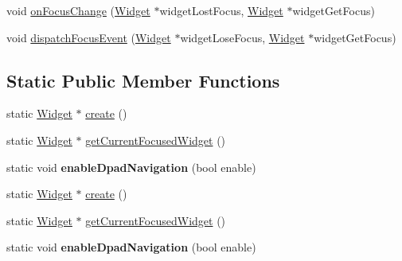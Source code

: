 \begin{DoxyCompactItemize}
void \hyperlink{classui_1_1Widget_a316bfe5fc7d6bd1ebab461af4b79f967}{on\+Focus\+Change} (\hyperlink{classui_1_1Widget}{Widget} $\ast$widget\+Lost\+Focus, \hyperlink{classui_1_1Widget}{Widget} $\ast$widget\+Get\+Focus)
\item 
void \hyperlink{classui_1_1Widget_ae54dd6bc70002d784f9b04fd7ccc057c}{dispatch\+Focus\+Event} (\hyperlink{classui_1_1Widget}{Widget} $\ast$widget\+Lose\+Focus, \hyperlink{classui_1_1Widget}{Widget} $\ast$widget\+Get\+Focus)
\end{DoxyCompactItemize}
\subsection*{Static Public Member Functions}
\begin{DoxyCompactItemize}
\item 
static \hyperlink{classui_1_1Widget}{Widget} $\ast$ \hyperlink{classui_1_1Widget_aa46d0b1357a7bbb7ed3c468e27a5533a}{create} ()
\item 
static \hyperlink{classui_1_1Widget}{Widget} $\ast$ \hyperlink{classui_1_1Widget_ad8525b896c511dee435bdc4251ed6964}{get\+Current\+Focused\+Widget} ()
\item 
\mbox{\label{classui_1_1Widget_abc6584697091ceb9dc81174b1be92979}} 
static void {\bfseries enable\+Dpad\+Navigation} (bool enable)
\item 
static \hyperlink{classui_1_1Widget}{Widget} $\ast$ \hyperlink{classui_1_1Widget_ab3a68a94480a985adbd851b7d1007839}{create} ()
\item 
static \hyperlink{classui_1_1Widget}{Widget} $\ast$ \hyperlink{classui_1_1Widget_a19ad19e126921fa54eec6e5ac8757719}{get\+Current\+Focused\+Widget} ()
\item 
\mbox{\label{classui_1_1Widget_ace7d22e8523bb1b1e7a7c0d3bade901b}} 
static void {\bfseries enable\+Dpad\+Navigation} (bool enable)
\end{DoxyCompactItemize}
